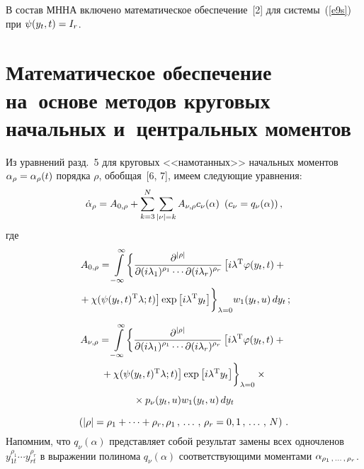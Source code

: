 \begin{multicols}{2}
В состав МННА включено математическое обеспечение~[2] для сис\-те\-мы~(\ref{e9s}) 
при $\psi (y_t, t) \hm= I_r$.

\section{Математическое обеспечение на~основе методов круговых начальных 
и~центральных моментов}

Из уравнений разд.~5 для круговых <<намотанных>> начальных моментов  
$\alpha_\rho \hm=\alpha_\rho (t)$ порядка  $\rho$, обобщая~[6, 7], имеем следующие уравнения:
\begin{equation}
\dot\alpha_\rho = A_{0,\rho} +\sum\limits_{k=3}^N \sum\limits_{\left\vert\nu\right\vert = 
k} A_{\nu,\rho} c_\nu (\alpha) \enskip ( c_\nu = q_\nu (\alpha))\,,\label{e21s}
\end{equation}
где
\begin{multline*}
A_{0,\rho} = \int\limits_{-\infty}^\infty \biggl\{ \displaystyle\frac{\displaystyle \partial^{|\rho |}\mathstrut}{\displaystyle \partial ( i\lambda_1)^{\rho_1} \cdots 
\partial ( i \lambda_r)^{\rho_r}\mathstrut}
\left[ i\lambda^{\mathrm{T}} \varphi(y_t, t) +{}\right.\\ 
\left.{}+\chi (\psi(y_t, t)^{\mathrm{T}}\lambda;t)\right] \exp \left[ i\lambda^{\mathrm{T}}
y_t\right]\biggr\}_{\lambda=0} 
w_1(y_t,u)\, dy_t\,;
\end{multline*}

\noindent
\begin{multline*}
A_{\nu,\rho} = \iin \biggl\{ \fr{\prt^{|\rho |}}{\prt ( i\lambda_1)^{\rho_1} \cdots 
\prt ( i \lambda_r)^{\rho_r}}
 \left[ i\lambda^{\mathrm{T}} \varphi(y_t, t) +{}\right.\\
\left. {}+ 
\chi (\psi(y_t, t)^{\mathrm{T}}\la;t)\right] \exp \lk i\lambda^{\mathrm{T}} 
y_t\rk\biggr\}_{\lambda=0} \times{}\\[4pt]
{}\times
p_\nu (y_t,u) w_1(y_t,u)\, dy_t %
\end{multline*}


\vspace*{-8pt}

\noindent
\begin{equation*}
\left(\left\vert \rho\right\vert = \rho_1 +\cdots + \rho_r , 
\rho_1 \,,\,\ldots\,,\, \rho_r = 0,1\,,\,\ldots\,,\, N\right)\,.
\end{equation*}
Напомним, что $q_\nu (\alpha)$ представляет собой результат замены всех 
одночленов $y_{1t}^{\rho_1} \cdots y_{rt}^{\rho_r}$ в выражении полинома  
$q_\nu (\alpha)$ соответствующими моментами $\alpha_{\rho_1\,,\,\ldots\,,\, \rho_r}$.

\medskip


\end{multicols}
